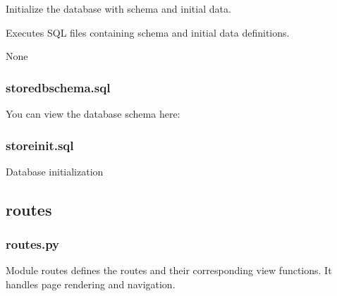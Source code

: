 \documentclass[letterpaper,10pt,english]{sphinxmanual}
\begin{document}

\begin{fulllineitems}
\label{\detokenize{store-service:db_api.init_database}}
\pysigstartsignatures
\pysiglinewithargsret
{}
{}
{}
\pysigstopsignatures
\sphinxAtStartPar
Initialize the database with schema and initial data.

\sphinxAtStartPar
Executes SQL files containing schema and initial data definitions.
\begin{description}
\sphinxAtStartPar
None

\end{description}

\end{fulllineitems}



\subsubsection{store\sphinxhyphen{}db\sphinxhyphen{}schema.sql}
\label{\detokenize{store-service:store-db-schema-sql}}
\sphinxAtStartPar
You can view the database schema here:


\subsubsection{store\sphinxhyphen{}init.sql}
\label{\detokenize{store-service:store-init-sql}}
\sphinxAtStartPar
Database initialization


\subsection{routes}
\label{\detokenize{store-service:routes}}

\subsubsection{routes.py}
\label{\detokenize{store-service:module-routes}}\label{\detokenize{store-service:routes-py}}
\sphinxAtStartPar
Module routes defines the routes and their corresponding view functions.
It handles page rendering and navigation.
\end{document}
